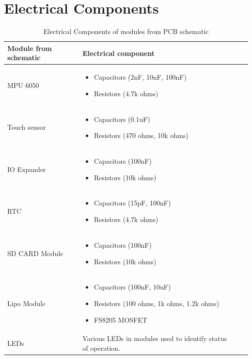 \documentclass[12pt, titlepage]{article}
\begin{document}
\section{Electrical Components}
\begin{table}[H]
	\begin{tabularx}{1.05\textwidth} { 
		  | >{\centering\arraybackslash}X 
		  | >{\centering\arraybackslash}X 
		  | >{\centering\arraybackslash}X 
		  | >{\centering\arraybackslash}X | }
		 \hline
		 \textbf{Module from schematic} & \textbf{Electrical component}\\
		\hline
		 MPU 6050  & \begin{itemize}
						\item{Capacitors (2nF, 10nF, 100nF)}
						\item{Resistors (4.7k ohms)}
					\end{itemize}\\
		\hline
		 Touch sensor  & \begin{itemize}
						\item{Capacitors (0.1uF)}
						\item{Resistors (470 ohms, 10k ohms)}
					\end{itemize}\\
		 \hline
		 IO Expander   & \begin{itemize}
						\item{Capacitors (100nF)}
						\item{Resistors (10k ohms)}
					\end{itemize}\\
		 \hline
		 RTC  & \begin{itemize}
						\item{Capacitors (15pF, 100nF)}
						\item{Resistors (4.7k ohms)}
					\end{itemize}\\
		 \hline
		 SD CARD Module   & \begin{itemize}
						\item{Capacitors (100nF)}
						\item{Resistors (10k ohms)}
					\end{itemize}\\
		 \hline
		 Lipo Module  & \begin{itemize}
						\item{Capacitors (100nF, 10uF)}
						\item{Resistors (100 ohms, 1k ohms, 1.2k ohms)}
						\item{FS8205 MOSFET}
					\end{itemize}\\
		 \hline
		 LEDs  & Various LEDs in modules used to identify status of operation.\\
		 \hline

	\end{tabularx}
\caption{\label{DesignElectrical}Electrical Components of modules from PCB schematic}  
\end{table}
\end{document}
